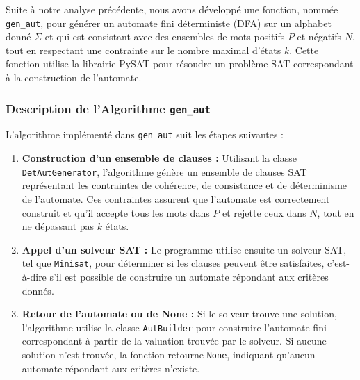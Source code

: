 Suite à notre analyse précédente, nous avons développé une fonction, nommée \texttt{gen\_aut}, pour générer un automate fini déterministe (DFA) sur un alphabet donné \( \Sigma \) et qui est consistant avec des ensembles de mots positifs \( P \) et négatifs \( N \), tout en respectant une contrainte sur le nombre maximal d'états \( k \). Cette fonction utilise la librairie PySAT pour résoudre un problème SAT correspondant à la construction de l'automate.


\subsubsection*{Description de l'Algorithme \texttt{gen\_aut}}

L'algorithme implémenté dans \texttt{gen\_aut} suit les étapes suivantes :

\begin{enumerate}
    \item \textbf{Construction d'un ensemble de clauses :} Utilisant la classe \texttt{DetAutGenerator}, l'algorithme génère un ensemble de clauses SAT représentant les contraintes de \hyperref[cohérence]{cohérence}, de \hyperref[consistance]{consistance} et de \hyperref[determinisme]{déterminisme} de l'automate. Ces contraintes assurent que l'automate est correctement construit et qu'il accepte tous les mots dans \( P \) et rejette ceux dans \( N \), tout en ne dépassant pas \( k \) états.\\

    \item \textbf{Appel d'un solveur SAT :} Le programme utilise ensuite un solveur SAT, tel que \texttt{Minisat}, pour déterminer si les clauses peuvent être satisfaites, c'est-à-dire s'il est possible de construire un automate répondant aux critères donnés.\\

    \item \textbf{Retour de l'automate ou de None :} Si le solveur trouve une solution, l'algorithme utilise la classe \texttt{AutBuilder} pour construire l'automate fini correspondant à partir de la valuation trouvée par le solveur. Si aucune solution n'est trouvée, la fonction retourne \texttt{None}, indiquant qu'aucun automate répondant aux critères n'existe.
\end{enumerate}

